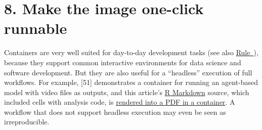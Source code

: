 \documentclass[10pt,letterpaper]{article}
\begin{document}
\hypertarget{make-the-image-one-click-runnable}{%
\section*{8. Make the image one-click
runnable}\label{make-the-image-one-click-runnable}}

  \label{rule:interactive} 

Containers are very well suited for day-to-day development tasks (see
also \hyperref[{rule:usage}]{Rule~}), because they
support common interactive environments for data science and software
development. But they are also useful for a ``headless'' execution of
full workflows. For example, {[}51{]} demonstrates a container for
running an agent-based model with video files as outputs, and this
article's \href{https://rmarkdown.rstudio.com/}{R Markdown} source,
which included cells with analysis code, is
\href{https://github.com/nuest/ten-simple-rules-dockerfiles/blob/master/.travis.yml\#L18}{rendered
into a PDF in a container}. A workflow that does not support headless
execution may even be seen as irreproducible.
\end{document}
